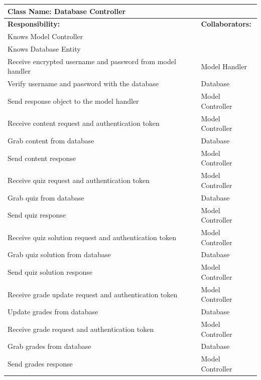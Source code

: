 \documentclass[]{article}
\begin{document}
\begin{enumerate}[a)]
	\begin{table}[ht]
	\centering
		\begin{tabular}{|p{5cm}|p{5cm}|}
		\hline
		 \multicolumn{2}{|l|}{\textbf{Class Name: Database Controller}} \\
		\hline
		\textbf{Responsibility:} & \textbf{Collaborators:} \\
		\hline
		Knows Model Controller & \\
		\hline
		Knows Database Entity & \\
		\hline
		Receive encrypted username and password from model handler & Model Handler \\
		\hline
		Verify username and password with the database & Database \\
		\hline
		Send response object to the model handler & Model Controller \\
		\hline
		Receive content request and authentication token & Model Controller \\
		\hline
		Grab content from database & Database \\
		\hline
		Send content response & Model Controller \\
		\hline
		Receive quiz request and authentication token & Model Controller \\
		\hline
		Grab quiz from database & Database \\
		\hline
		Send quiz response & Model Controller \\
		\hline
		Receive quiz solution request and authentication token & Model 		Controller \\
		\hline
		Grab quiz solution from database & Database \\
		\hline
		Send quiz solution response & Model Controller \\
		\hline
		Receive grade update request and authentication token & Model Controller \\
		\hline
		Update grades from database & Database \\
		\hline
		Receive grade request and authentication token & Model 	Controller \\
		\hline
		Grab grades from database & Database \\
		\hline
		Send grades response & Model Controller \\
		\hline
		\end{tabular}
	\end{table}

\end{enumerate}
\end{document}
